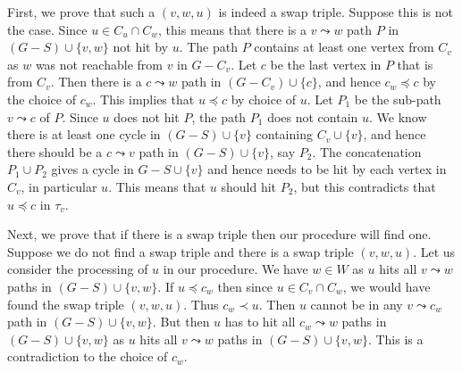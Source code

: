 First, we prove that such a $(v,w,u)$ is indeed a swap triple.
Suppose this is not the case.
Since $u\in C_u\cap C_w$, this means that 
there is a $v\leadsto w$ path $P$ in $(G-S)\cup\{v,w\}$ not hit by $u$.
The path $P$ contains at least one vertex from $C_v$ as $w$ was not reachable from $v$ in $G-C_v$.
Let $c$ be the last vertex in $P$ that is from $C_v$.
Then there is a $c\leadsto w$ path in $(G-C_v)\cup\{c\}$,
and hence $c_w\preceq c$ by the choice of $c_w$.
This implies that $u\preceq c$ by choice of $u$.
Let $P_1$ be the sub-path $v\leadsto c$ of $P$.
Since $u$ does not hit $P$, the path $P_1$ does not contain $u$.
We know there is at least one cycle in $(G-S)\cup \{v\}$ containing $C_v\cup \{v\}$, and hence there should be a $c\leadsto v$ path in $(G-S)\cup \{v\}$, say $P_2$.
The concatenation $P_1\cup P_2$ gives a cycle in $G-S\cup\{v\}$ and hence needs to be hit by each vertex in $C_v$, in particular $u$.
This means that $u$ should hit $P_2$, but this contradicts that $u\preceq c$ in $\tau_v$.


Next, we prove that if there is a swap triple then our procedure will find one.
Suppose we do not find a swap triple and there is a swap triple $(v,w,u)$.
Let us consider the processing of $u$ in our procedure.
We have $w\in W$ as $u$ hits all $v\leadsto w$ paths in $(G-S)\cup \{v,w\}$.
If $u\preceq c_w$ then since $u\in C_v\cap C_w$, we would have found the swap triple  $(v,w,u)$.
Thus $c_w\prec u$.
Then $u$ cannot be in any $v\leadsto c_w$ path in $(G-S)\cup \{v,w\}$.
But then $u$ has to hit all $c_w\leadsto w$ paths in $(G-S)\cup \{v,w\}$ as $u$ hits all $v\leadsto w$ paths in $(G-S)\cup \{v,w\}$.
This is a contradiction to the choice of $c_w$.

